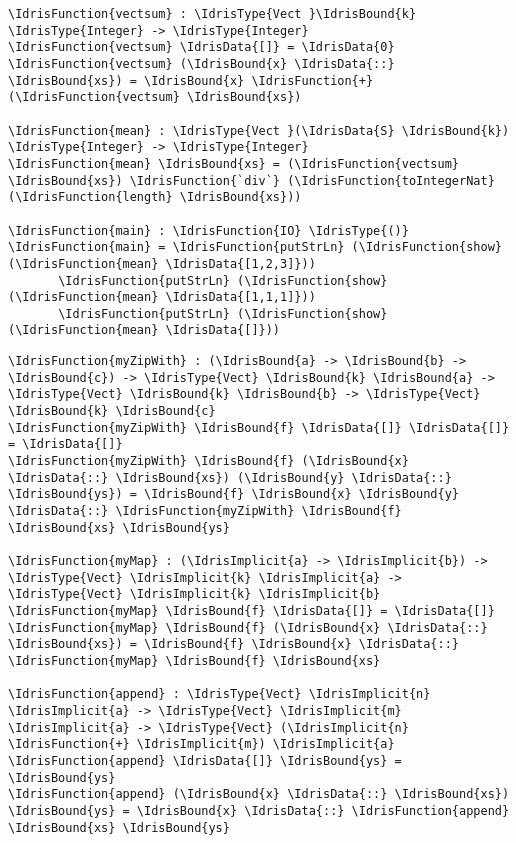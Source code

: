 \documentclass[xetex,xcolor={usenames,dvipsnames},mathserif,serif,17pt]{beamer}
\newcommand{\IdrisData}[1]{\textcolor{red}{#1}}
\newcommand{\IdrisType}[1]{\textcolor{blue}{#1}}
\newcommand{\IdrisBound}[1]{\textcolor{violet}{#1}}
\newcommand{\IdrisFunction}[1]{\textcolor{OliveGreen}{#1}}
\newcommand{\IdrisImplicit}[1]{{\itshape \IdrisBound{#1}}}
\begin{document}
\begin{frame}[fragile]
  \begin{Verbatim}[commandchars=\\\{\}]
\IdrisFunction{vectsum} : \IdrisType{Vect }\IdrisBound{k} \IdrisType{Integer} -> \IdrisType{Integer}
\IdrisFunction{vectsum} \IdrisData{[]} = \IdrisData{0}
\IdrisFunction{vectsum} (\IdrisBound{x} \IdrisData{::} \IdrisBound{xs}) = \IdrisBound{x} \IdrisFunction{+} (\IdrisFunction{vectsum} \IdrisBound{xs})

\IdrisFunction{mean} : \IdrisType{Vect }(\IdrisData{S} \IdrisBound{k}) \IdrisType{Integer} -> \IdrisType{Integer}
\IdrisFunction{mean} \IdrisBound{xs} = (\IdrisFunction{vectsum} \IdrisBound{xs}) \IdrisFunction{`div`} (\IdrisFunction{toIntegerNat} (\IdrisFunction{length} \IdrisBound{xs}))

\IdrisFunction{main} : \IdrisFunction{IO} \IdrisType{()}
\IdrisFunction{main} = \IdrisFunction{putStrLn} (\IdrisFunction{show} (\IdrisFunction{mean} \IdrisData{[1,2,3]}))
       \IdrisFunction{putStrLn} (\IdrisFunction{show} (\IdrisFunction{mean} \IdrisData{[1,1,1]}))
       \IdrisFunction{putStrLn} (\IdrisFunction{show} (\IdrisFunction{mean} \IdrisData{[]}))
  \end{Verbatim}
\end{frame}

\begin{frame}[fragile]
\begin{Verbatim}[commandchars=\\\{\}]
\IdrisFunction{myZipWith} : (\IdrisBound{a} -> \IdrisBound{b} -> \IdrisBound{c}) -> \IdrisType{Vect} \IdrisBound{k} \IdrisBound{a} -> \IdrisType{Vect} \IdrisBound{k} \IdrisBound{b} -> \IdrisType{Vect} \IdrisBound{k} \IdrisBound{c}
\IdrisFunction{myZipWith} \IdrisBound{f} \IdrisData{[]} \IdrisData{[]} = \IdrisData{[]}
\IdrisFunction{myZipWith} \IdrisBound{f} (\IdrisBound{x} \IdrisData{::} \IdrisBound{xs}) (\IdrisBound{y} \IdrisData{::} \IdrisBound{ys}) = \IdrisBound{f} \IdrisBound{x} \IdrisBound{y} \IdrisData{::} \IdrisFunction{myZipWith} \IdrisBound{f} \IdrisBound{xs} \IdrisBound{ys}

\IdrisFunction{myMap} : (\IdrisImplicit{a} -> \IdrisImplicit{b}) -> \IdrisType{Vect} \IdrisImplicit{k} \IdrisImplicit{a} -> \IdrisType{Vect} \IdrisImplicit{k} \IdrisImplicit{b}
\IdrisFunction{myMap} \IdrisBound{f} \IdrisData{[]} = \IdrisData{[]}
\IdrisFunction{myMap} \IdrisBound{f} (\IdrisBound{x} \IdrisData{::} \IdrisBound{xs}) = \IdrisBound{f} \IdrisBound{x} \IdrisData{::} \IdrisFunction{myMap} \IdrisBound{f} \IdrisBound{xs}

\IdrisFunction{append} : \IdrisType{Vect} \IdrisImplicit{n} \IdrisImplicit{a} -> \IdrisType{Vect} \IdrisImplicit{m} \IdrisImplicit{a} -> \IdrisType{Vect} (\IdrisImplicit{n} \IdrisFunction{+} \IdrisImplicit{m}) \IdrisImplicit{a}
\IdrisFunction{append} \IdrisData{[]} \IdrisBound{ys} = \IdrisBound{ys}
\IdrisFunction{append} (\IdrisBound{x} \IdrisData{::} \IdrisBound{xs}) \IdrisBound{ys} = \IdrisBound{x} \IdrisData{::} \IdrisFunction{append} \IdrisBound{xs} \IdrisBound{ys}
\end{Verbatim}
\end{frame}
\end{document}
